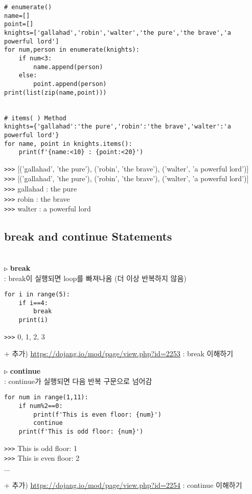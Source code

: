 \documentclass[11pt,a4paper]{article}
\begin{document}
\begin{spacing}{1.5}
\begin{lstlisting}[label={list:first}]
# enumerate()
name=[]
point=[]
knights=['gallahad','robin','walter','the pure','the brave','a powerful lord']
for num,person in enumerate(knights):
    if num<3:
        name.append(person)
    else:
        point.append(person)
print(list(zip(name,point)))


# items( ) Method
knights={'gallahad':'the pure','robin':'the brave','walter':'a powerful lord'}
for name, point in knights.items():
    print(f'{name:<10} : {point:<20}')
\end{lstlisting}
\verb|>>>| [('gallahad', 'the pure'), ('robin', 'the brave'), ('walter', 'a powerful lord')]\\

\verb|>>>| [('gallahad', 'the pure'), ('robin', 'the brave'), ('walter', 'a powerful lord')]\\

\verb|>>>| gallahad   : the pure   \\
\verb|>>>| robin      : the brave           \\
\verb|>>>| walter     : a powerful lord     \\

\subsection{\Large\textbf{break and continue Statements}}\\
\texttt{▷} \textbf{break}\\
: break이 실행되면 loop를 빠져나옴 (더 이상 반복하지 않음)
\begin{lstlisting}[label={list:first}]
for i in range(5):
    if i==4:
        break
    print(i)
\end{lstlisting}
\verb|>>>| 0, 1, 2, 3

+ 추가) \url{https://dojang.io/mod/page/view.php?id=2253} : break 이해하기

\texttt{▷} \textbf{continue}\\
: continue가 실행되면 다음 반복 구문으로 넘어감
\begin{lstlisting}[label={list:first}]
for num in range(1,11):
    if num%2==0:
        print(f'This is even floor: {num}')
        continue
    print(f'This is odd floor: {num}')
\end{lstlisting}
\verb|>>>| This is odd floor: 1\\
\verb|>>>| This is even floor: 2\\
...

+ 추가) \url{https://dojang.io/mod/page/view.php?id=2254} : continue 이해하기


\end{spacing}
\end{document}
